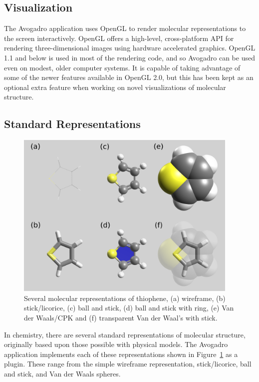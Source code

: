 \documentclass[10pt]{bmc_article}
\newenvironment{bmcformat}{\begin{raggedright}
\baselineskip20pt\sloppy\setboolean{publ}{false}}{\end{raggedright}
\baselineskip20pt\sloppy}
\begin{document}
\begin{bmcformat}
\section{Visualization}

The Avogadro application uses OpenGL to render molecular representations to the
screen interactively. OpenGL offers a high-level, cross-platform API for rendering
three-dimensional images using hardware accelerated graphics. OpenGL
1.1 and below is used in most of the rendering code, and so Avogadro can be used
even on modest, older computer systems. It is capable of taking advantage of
some of the newer features available in OpenGL 2.0, but this has been kept as an
optional extra feature when working on novel visualizations of molecular
structure.

\subsection{Standard Representations}

\begin{figure}
  \includegraphics[width=0.95\textwidth]{images/standardRepsLabel}
  \caption{Several molecular representations of thiophene, (a) wireframe,
   (b) stick/licorice, (c) ball and stick, (d) ball and stick with ring,
    (e) Van der Waals/CPK and (f) transparent Van der Waal's with stick.}
 \label{f:standardReps}
\end{figure}

In chemistry, there are several standard representations of molecular structure,
originally based upon those possible with physical models. The Avogadro
application implements each of these representations shown in
Figure~\ref{f:standardReps} as a plugin. These range from the simple wireframe
representation, stick/licorice, ball and stick, and Van der Waals spheres.


\end{bmcformat}
\end{document}
